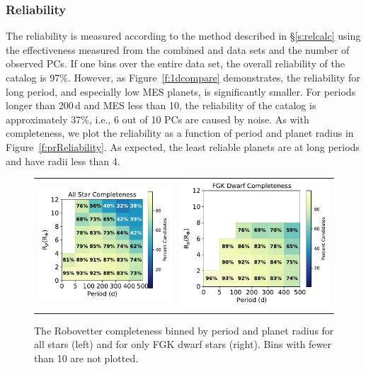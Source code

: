 \subsubsection{Reliability}
\label{s:reliability}
The reliability is measured according to the method described in \S\ref{s:relcalc} using the effectiveness measured from the combined \scrtce{} and \invtce{} data sets and the number of observed PCs.  If one bins over the entire data set, the overall reliability of the catalog is 97\%. However, as Figure~\ref{f:1dcompare} demonstrates, the reliability for long period, and especially low MES planets, is significantly smaller.  For periods longer than 200\,d and MES less than 10, the reliability of the catalog is approximately 37\%, i.e., 6 out of 10 PCs are caused by noise. As with completeness, we plot the reliability as a function of period and planet radius in Figure~\ref{f:prReliability}. As expected, the least reliable planets are at long periods and have radii less than 4\re. 


\begin{figure}[ht]
\begin{center}
\begin{tabular}{cc}
\includegraphics[width=0.5\linewidth]{f10-left.pdf} &
\includegraphics[width=0.5\linewidth]{f10-right.pdf}
\end{tabular}
\caption{The Robovetter completeness binned by period and planet radius for all stars (left) and for only FGK dwarf stars (right). Bins with fewer than 10  are not plotted.}
\label{f:prCompleteness}
\end{center}
\end{figure}


